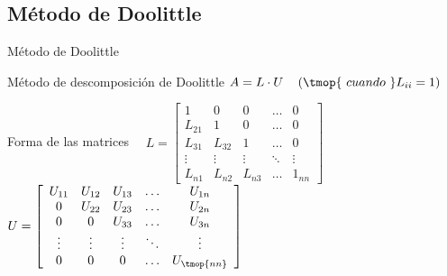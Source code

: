 \documentclass [8pt] {beamer}
\begin{document}
    \subsection{Método de Doolittle}
        \begin{frame}{Método de Doolittle}
            \begin{block}{Método de descomposición de Doolittle}
                { $A = L \cdot U \ \ \ \left(\tmop{\ cuando \ }L_{i i} = 1\right)$}
            \end{block}
            \begin{block}{Forma de las matrices}
                {\ \ $L = \left[ \begin{array}{ccccc}
                1 & 0 & 0 & \ldots & 0\\
                L_{21} & 1 & 0 & \ldots & 0\\
                L_{31} & L_{32} & 1 & \ldots & 0\\
                \vdots & \vdots & \vdots & \ddots & \vdots\\
                L_{n 1} & L_{n 2} & L_{n 3} & \ldots & 1_{n n}
                \end{array} \right] $ \ \ \ \ \ \ \ \ \ \ \ $U = \left[ \begin{array}{ccccc}
                U_{11} & U_{12} & U_{13} & \ldots & U_{1 n}\\
                0 & U_{22} & U_{23} & \ldots & U_{2 n}\\
                0 & 0 & U_{33} & \ldots & U_{3 n}\\
                \vdots & \vdots & \vdots & \ddots & \vdots\\
                0 & 0 & 0 & \ldots & U_{\tmop{nn}}
                \end{array} \right] $}
            \end{block}
        \end{frame}
\end{document}
